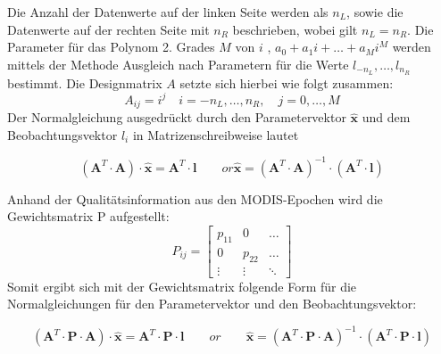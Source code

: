 \documentclass[11pt]{report}
\begin{document}
Die Anzahl der Datenwerte auf der linken Seite werden als $n_L$, sowie die Datenwerte auf der rechten Seite mit $n_R$ beschrieben, wobei gilt $n_L = n_R$.
Die Parameter für das Polynom 2. Grades $M$ von $i$ , $a_0+a_1i+\dots+a_Mi^M$ werden mittels der Methode Ausgleich nach Parametern für die Werte $l_{-n_L},\dots,l_{n_R}$ bestimmt. Die Designmatrix $A$ setzte sich hierbei wie folgt zusammen:
\begin{equation}
A_{ij} = i^j\quad i = -n_L, \dots, n_R,\quad j =0,\dots,M
\end{equation}
Der Normalgleichung ausgedrückt durch den Parametervektor $\widehat{\textbf{x}}$ und dem Beobachtungsvektor \textbf{$l_i$} in Matrizenschreibweise lautet

\begin{equation}
\left(\textbf{A}^T\cdot\textbf{A}\right)\cdot\widehat{\textbf{x}}=\textbf{A}^T\cdot\textbf{l}\qquad or  \widehat{\textbf{x}}=\left(\textbf{A}^T\cdot\textbf{A}\right)^{-1}\cdot\left(\textbf{A}^T\cdot\textbf{l}\right)
\end{equation}\newline


Anhand der Qualitätsinformation aus den MODIS-Epochen wird die Gewichtsmatrix P aufgestellt:
\begin{equation}
\label{p_mat}
P_{ij} = \left[ \begin{array}{cccc} p_{11} & 0 & \ldots \\0 & p_{22} & \ldots \\ \vdots & \vdots & \ddots \end{array} \right]
\end{equation}\newline
Somit ergibt sich mit der Gewichtsmatrix folgende Form für die Normalgleichungen für den Parametervektor und den Beobachtungsvektor:

\begin{equation}
\left(\textbf{A}^T\cdot\textbf{P}\cdot\textbf{A}\right)\cdot\widehat{\textbf{x}}=\textbf{A}^T\cdot\textbf{P}\cdot\textbf{l}\qquad or \qquad \widehat{\textbf{x}}=\left(\textbf{A}^T\cdot\textbf{P}\cdot\textbf{A}\right)^{-1}\cdot\left(\textbf{A}^T\cdot\textbf{P}\cdot\textbf{l}\right)
\end{equation}\newline
\end{document}
